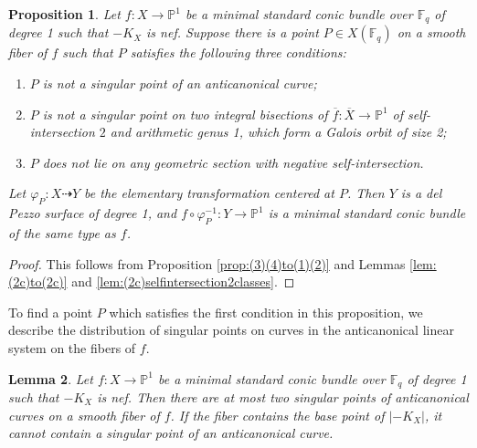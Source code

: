 \documentclass[a4paper, 11pt, reqno]{amsart}
\numberwithin{equation}{section} \numberwithin{figure}{section}
\def \F {{\mathbb F}}
\def \P {{\mathbb P}}
\newcommand{\ra}{\rightarrow}
\newtheorem{lemma}{Lemma}
\newtheorem{proposition}[lemma]{Proposition}
\theoremstyle{definition}
\numberwithin{lemma}{section}
\begin{document}
\begin{proposition}\label{prop:(2c)to(3)}
    Let $f \colon X \ra \P^1$ be a minimal standard conic bundle over $\F_q$ of degree 1 such that $-K_X$ is nef. Suppose there is a point $P \in X(\F_q)$ on a smooth fiber of $f$ such that $P$ satisfies the following three conditions:
    \begin{enumerate}[label=(\alph*)]
        \item $P$ is not a singular point of an anticanonical curve;
        \item $P$ is not a singular point on two integral bisections of $\overline{f} \colon \overline{X} \ra \P^1$ of self-intersection $2$ and arithmetic genus 1, which form a Galois orbit of size 2;\label{item:(2c)to(3)part(b)}
        \item $P$ does not lie on any geometric section with negative self-intersection.\label{item:(2c)to(3)part(c)}
    \end{enumerate}
    Let $\varphi_{\scriptscriptstyle P} \colon X \dashrightarrow Y$ be the elementary transformation centered at $P$. Then $Y$ is a del Pezzo surface of degree 1, and $f \circ \varphi_{\scriptscriptstyle P}^{-1} \colon Y \ra \P^1$ is a minimal standard conic bundle of the same type as $f$.
\end{proposition}

\begin{proof}
    This follows from Proposition \ref{prop:(3)(4)to(1)(2)} and Lemmas \ref{lem:(2c)to(2c)} and \ref{lem:(2c)selfintersection2classes}.
\end{proof}

To find a point $P$ which satisfies the first condition in this proposition, we describe the distribution of singular points on curves in the anticanonical linear system on the fibers of $f$. 

\begin{lemma}\label{lem:(2)singpointsanticanonical}
    Let $f \colon X \ra \P^1$ be a minimal standard conic bundle over $\F_q$ of degree 1 such that $-K_X$ is nef. Then there are at most two singular points of anticanonical curves on a smooth fiber of $f$. If the fiber contains the base point of $|-K_X|$, it cannot contain a singular point of an anticanonical curve.
\end{lemma}
\end{document}
